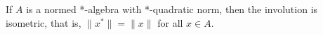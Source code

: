 If $A$ is a normed *-algebra with *-quadratic norm, then the involution is isometric, that is, $\|x^*\| = \|x\|$ for all $x \in A$.
